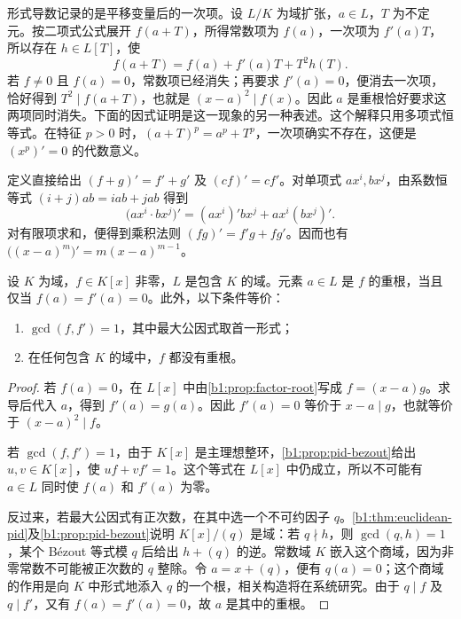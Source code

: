 形式导数记录的是平移变量后的一次项。设 \(L/K\) 为域扩张，\(a\in L\)，\(T\) 为不定元。按二项式公式展开 \(f(a+T)\)，所得常数项为 \(f(a)\)，一次项为 \(f'(a)T\)，所以存在 \(h\in L[T]\)，使
\[
	f(a+T)=f(a)+f'(a)T+T^2h(T).
\]
若 \(f\ne0\) 且 \(f(a)=0\)，常数项已经消失；再要求 \(f'(a)=0\)，便消去一次项，恰好得到 \(T^2\mid f(a+T)\)，也就是 \((x-a)^2\mid f(x)\)。因此 \(a\) 是重根恰好要求这两项同时消失。下面的因式证明是这一现象的另一种表述。这个解释只用多项式恒等式。在特征 \(p>0\) 时，\((a+T)^p=a^p+T^p\)，一次项确实不存在，这便是 \((x^p)'=0\) 的代数意义。

\ProseParagraphBreak
定义直接给出 \((f+g)'=f'+g'\) 及 \((cf)'=cf'\)。对单项式 \(ax^i,bx^j\)，由系数恒等式 \((i+j)ab=iab+jab\) 得到
\[
	\bigl(ax^i\cdot bx^j\bigr)'=(ax^i)'bx^j+ax^i(bx^j)'.
\]
对有限项求和，便得到乘积法则 \((fg)'=f'g+fg'\)。因而也有 \(\bigl((x-a)^m\bigr)'=m(x-a)^{m-1}\)。

\begin{proposition}[重根判别]\label{b1:prop:multiple-root}
	设 \(K\) 为域，\(f\in K[x]\) 非零，\(L\) 是包含 \(K\) 的域。元素 \(a\in L\) 是 \(f\) 的重根，当且仅当 \(f(a)=f'(a)=0\)。此外，以下条件等价：
	\begin{enumerate}
		\item \(\gcd(f,f')=1\)，其中最大公因式取首一形式；
		\item 在任何包含 \(K\) 的域中，\(f\) 都没有重根。
	\end{enumerate}
\end{proposition}
\begin{proof}
	若 \(f(a)=0\)，在 \(L[x]\) 中由\cref{b1:prop:factor-root}写成 \(f=(x-a)g\)。求导后代入 \(a\)，得到 \(f'(a)=g(a)\)。因此 \(f'(a)=0\) 等价于 \(x-a\mid g\)，也就等价于 \((x-a)^2\mid f\)。

	若 \(\gcd(f,f')=1\)，由于 \(K[x]\) 是主理想整环，\cref{b1:prop:pid-bezout}给出 \(u,v\in K[x]\)，使 \(uf+vf'=1\)。这个等式在 \(L[x]\) 中仍成立，所以不可能有 \(a\in L\) 同时使 \(f(a)\) 和 \(f'(a)\) 为零。

	反过来，若最大公因式有正次数，在其中选一个不可约因子 \(q\)。\cref{b1:thm:euclidean-pid}及\cref{b1:prop:pid-bezout}说明 \(K[x]/(q)\) 是域：若 \(q\nmid h\)，则 \(\gcd(q,h)=1\)，某个 Bézout 等式模 \(q\) 后给出 \(h+(q)\) 的逆。常数域 \(K\) 嵌入这个商域，因为非零常数不可能被正次数的 \(q\) 整除。令 \(a=x+(q)\)，便有 \(q(a)=0\)；这个商域的作用是向 \(K\) 中形式地添入 \(q\) 的一个根，相关构造将在系统研究。由于 \(q\mid f\) 及 \(q\mid f'\)，又有 \(f(a)=f'(a)=0\)，故 \(a\) 是其中的重根。
\end{proof}

